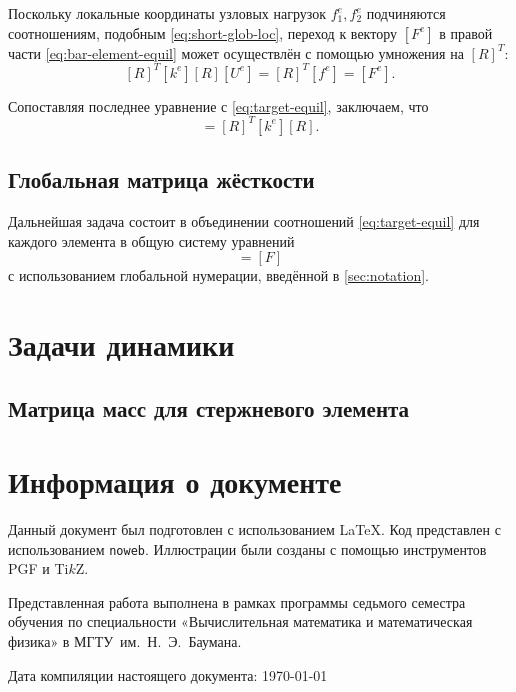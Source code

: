 \documentclass[10pt]{article}
\numberwithin{equation}{section}
\newcommand{\program}[1]{{\tt #1}}
\newcommand{\matr}[1]{[#1]}
\begin{document}
Поскольку локальные координаты узловых нагрузок $f_1^e, f_2^e$
подчиняются соотношениям, подобным \eqref{eq:short-glob-loc}, переход
к вектору $\matr{F^e}$ в правой части \eqref{eq:bar-element-equil}
может осуществлён с помощью умножения на $\matr{R}^T$:
\begin{equation}
  \label{eq:bar-global-equil}
  \matr{R}^T\matr{k^e}\matr{R}\matr{U^e}=\matr{R}^T\matr{f^e} = \matr{F^e}.
\end{equation}

Сопоставляя последнее уравнение с \eqref{eq:target-equil}, заключаем,
что
\begin{equation*}
  \matr{K^e} = \matr{R}^T\matr{k^e}\matr{R}.
\end{equation*}

\subsection{Глобальная матрица жёсткости}

Дальнейшая задача состоит в объединении соотношений
\eqref{eq:target-equil} для каждого элемента в общую систему уравнений
\begin{equation}
  \matr{K}\matr{U}=\matr{F}
\end{equation}
с использованием глобальной нумерации, введённой в \ref{sec:notation}.

\section{Задачи динамики}

\subsection{Матрица масс для стержневого элемента}

\clearpage
\appendix
\section{Информация о документе}

Данный документ был подготовлен с использованием \LaTeX{}. Код
представлен с использованием \program{noweb}. Иллюстрации были созданы
с помощью инструментов PGF и Ti$k$Z.

Представленная работа выполнена в рамках программы седьмого семестра
обучения по специальности «Вычислительная математика и математическая
физика» в МГТУ им. Н. Э. Баумана.

Дата компиляции настоящего документа: \today



\end{document}
